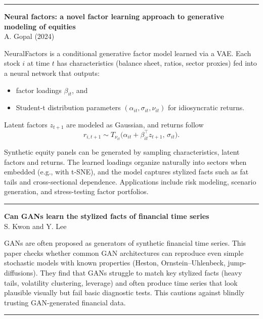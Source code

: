 \documentclass[a5paper]{article}
\providecommand{\tightlist}{%
  \setlength{\itemsep}{0pt}\setlength{\parskip}{0pt}}
\begin{document}
\begin{center}\rule{0.5\linewidth}{0.5pt}\end{center}

\textbf{Neural factors: a novel factor learning approach to generative
modeling of equities}\\
A. Gopal (2024)

NeuralFactors is a conditional generative factor model learned via a
VAE. Each stock $i$ at time $t$ has characteristics (balance sheet, ratios,
sector proxies) fed into a neural network that outputs:

\begin{itemize}
\tightlist
\item
factor loadings $\beta_{it}$, and
\item
Student-t distribution parameters $(\alpha_{it}, \sigma_{it}, \nu_{it})$
  for idiosyncratic returns.
\end{itemize}

Latent factors $z_{t+1}$ are modeled as Gaussian, and returns follow
\[ r_{i,t+1} \sim T_{\nu_{it}}\bigl(\alpha_{it} + \beta_{it}^\top z_{t+1},\, \sigma_{it}\bigr). \]

Synthetic equity panels can be generated by sampling characteristics,
latent factors and returns. The learned loadings organize naturally into
sectors when embedded (e.g., with t-SNE), and the model captures
stylized facts such as fat tails and cross-sectional dependence.
Applications include risk modeling, scenario generation, and
stress-testing factor portfolios.

\begin{center}\rule{0.5\linewidth}{0.5pt}\end{center}

\textbf{Can GANs learn the stylized facts of financial time series}\\
S. Kwon and Y. Lee

GANs are often proposed as generators of synthetic financial time
series. This paper checks whether common GAN architectures can reproduce
even simple stochastic models with known properties (Heston,
Ornstein--Uhlenbeck, jump-diffusions). They find that GANs struggle to
match key stylized facts (heavy tails, volatility clustering, leverage)
and often produce time series that look plausible visually but fail
basic diagnostic tests. This cautions against blindly trusting
GAN-generated financial data.

\begin{center}\rule{0.5\linewidth}{0.5pt}\end{center}
\end{document}
